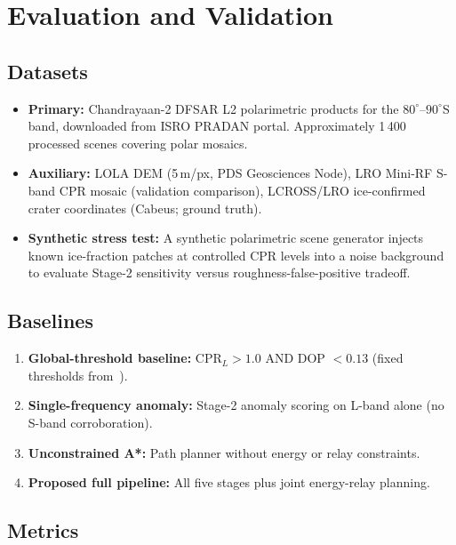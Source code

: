 \documentclass[10pt,conference]{IEEEtran}
\begin{document}
\section{Evaluation and Validation}
\label{sec:experiments}

\subsection{Datasets}

\begin{itemize}
  \item \textbf{Primary:} Chandrayaan-2 DFSAR L2 polarimetric products
    for the $80^\circ$--$90^\circ$S band, downloaded from ISRO PRADAN portal.
    Approximately 1\,400 processed scenes covering polar mosaics.
  \item \textbf{Auxiliary:} LOLA DEM (5\,m/px, PDS Geosciences Node),
    LRO Mini-RF S-band CPR mosaic (validation comparison),
    LCROSS/LRO ice-confirmed crater coordinates (Cabeus; ground truth).
  \item \textbf{Synthetic stress test:} A synthetic polarimetric scene
    generator injects known ice-fraction patches at controlled CPR levels
    into a noise background to evaluate Stage-2 sensitivity versus
    roughness-false-positive tradeoff.
\end{itemize}

\subsection{Baselines}

\begin{enumerate}
  \item \textbf{Global-threshold baseline:} CPR$_L > 1.0$ AND
    DOP $< 0.13$ (fixed thresholds from~\cite{kumar2022dfsar}).
  \item \textbf{Single-frequency anomaly:} Stage-2 anomaly scoring on
    L-band alone (no S-band corroboration).
  \item \textbf{Unconstrained A*:} Path planner without energy or relay
    constraints.
  \item \textbf{Proposed full pipeline:} All five stages plus joint
    energy-relay planning.
\end{enumerate}

\subsection{Metrics}
\end{document}
